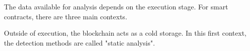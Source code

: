 The data available for analysis depends on the execution stage.
For smart contracts, there are three main contexts.

Outside of execution, the blockchain acts as a cold storage.
In this first context, the detection methods are called "static analysis".
